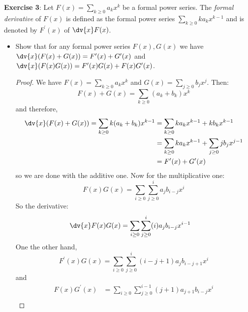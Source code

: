\documentclass{article}
\begin{document}
\textbf{Exercise 3}: Let $F(x) = \sum_{k \geq 0}a_{k}x^{k}$ be a formal power series. The \textit{formal derivative} of $F(x)$ is defined as the formal power series $\sum_{k \geq 0} ka_{k}x^{k - 1}$ and is denoted by $F^{\prime}(x)$ of $\dv{x}F(x)$.
    \begin{itemize}
        \item Show that for any formal power series $F(x), G(x)$ we have $\dv{x}(F(x) + G(x)) = F^{\prime}(x) + G^{\prime}(x)$ and $\dv{x}(F(x)G(x)) = F^{\prime}(x)G(x) + F(x)G^{\prime}(x)$.
            \begin{proof}
                We have $F(x) = \sum_{k \geq 0}a_{k}x^{k}$ and $G(x) = \sum_{j \geq 0}b_{j}x^{j}$. Then:
                    \begin{equation*}
                        F(x) + G(x) = \sum_{k \geq 0}(a_{k} + b_{k})x^{k}
                    \end{equation*}
                and therefore,
                    \begin{align*}
                        \dv{x}(F(x) + G(x)) = \sum_{k \geq 0}k(a_{k} + b_{k})x^{k - 1} &= \sum_{k \geq 0} ka_{k}x^{k - 1} + kb_{k}x^{k - 1} \\
                        &= \sum_{k\geq 0}ka_{k}x^{k - 1} + \sum_{j \geq 0} jb_{j}x^{j - 1} \\
                        &= F^{\prime}(x) + G^{\prime}(x)
                    \end{align*}
                so we are done with the additive one. Now for the multiplicative one:
                    \begin{equation*}
                        F(x)G(x) = \sum_{i \geq 0}\sum_{j \geq 0}^{i} a_{j}b_{i - j}x^{i}
                    \end{equation*}
                So the derivative:
                    \begin{align*}
                        \dv{x}F(x)G(x) &= \sum_{i \geq 0}\sum_{j \geq 0}^{i} (i)a_{j}b_{i - j}x^{i - 1} 
                    \end{align*}
                One the other hand, 
                    \begin{equation*}
                        F^{\prime}(x)G(x) = \sum_{i \geq 0}\sum_{j \geq 0}^{i} (i - j + 1)a_{j}b_{i - j + 1} x^{i}
                    \end{equation*}
                and
                    \begin{align*}
                        F(x)G^{\prime}(x) &= \sum_{i \geq 0}\sum_{j \geq 0}^{i - 1} (j + 1)a_{j + 1}b_{i - j}x^{i} \\

\end{align*}
\end{proof}
\end{itemize}
\end{document}
